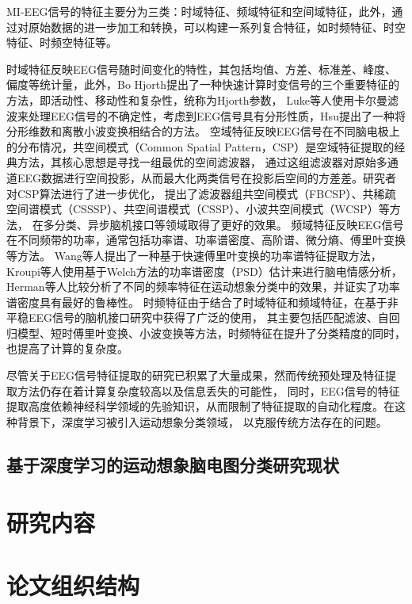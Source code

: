MI-EEG信号的特征主要分为三类：时域特征、频域特征和空间域特征\cite{altaheri2023deep}，此外，通过对原始数据的进一步加工和转换，可以构建一系列复合特征，如时频特征、时空特征、时频空特征等。

时域特征反映EEG信号随时间变化的特性，其包括均值、方差、标准差、峰度、偏度等统计量，此外，Bo Hjorth提出了一种快速计算时变信号的三个重要特征的方法，即活动性、移动性和复杂性，统称为Hjorth参数\cite{HJORTH1970306}，
Luke等人使用卡尔曼滤波来处理EEG信号的不确定性\cite{7448410}，考虑到EEG信号具有分形性质，Hsu提出了一种将分形维数和离散小波变换相结合的方法\cite{HSU2010295}。
空域特征反映EEG信号在不同脑电极上的分布情况，共空间模式（Common Spatial Pattern，CSP）是空域特征提取的经典方法，其核心思想是寻找一组最优的空间滤波器，
通过这组滤波器对原始多通道EEG数据进行空间投影，从而最大化两类信号在投影后空间的方差差\cite{wang2006common}。研究者对CSP算法进行了进一步优化，
提出了滤波器组共空间模式（FBCSP）\cite{ang2008filter}、共稀疏空间谱模式（CSSSP）\cite{dornhege2006combined}、共空间谱模式（CSSP）\cite{lemm2005spatio}、小波共空间模式（WCSP）\cite{mousavi2011wavelet}等方法，
在多分类、异步脑机接口等领域取得了更好的效果。
频域特征反映EEG信号在不同频带的功率，通常包括功率谱、功率谱密度、高阶谱、微分熵、傅里叶变换等方法。
Wang等人提出了一种基于快速傅里叶变换的功率谱特征提取方法\cite{wang2017tinnitus}，Kroupi等人使用基于Welch方法的功率谱密度（PSD）估计来进行脑电情感分析\cite{kroupi2011eeg}，
Herman等人比较分析了不同的频率特征在运动想象分类中的效果，并证实了功率谱密度具有最好的鲁棒性\cite{herman2008comparative}。
时频特征由于结合了时域特征和频域特征，在基于非平稳EEG信号的脑机接口研究中获得了广泛的使用\cite{pawar2020feature}，
其主要包括匹配滤波、自回归模型、短时傅里叶变换、小波变换等方法，时频特征在提升了分类精度的同时，也提高了计算的复杂度。

尽管关于EEG信号特征提取的研究已积累了大量成果，然而传统预处理及特征提取方法仍存在着计算复杂度较高以及信息丢失的可能性，
同时，EEG信号的特征提取高度依赖神经科学领域的先验知识，从而限制了特征提取的自动化程度\cite{altaheri2023deep}。在这种背景下，深度学习被引入运动想象分类领域，
以克服传统方法存在的问题。

\subsection{基于深度学习的运动想象脑电图分类研究现状}

\section{研究内容}

\section{论文组织结构}